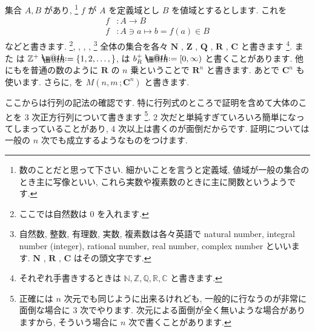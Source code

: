 \documentclass[openany, a4paper, oneside]{jsbook}
\makeatletter
\newcommand*{\defeq}{\mathrel{\rlap{%
\raisebox{0.3ex}{$\m@th\cdot$}}%
\raisebox{-0.3ex}{$\m@th\cdot$}}%
=}
\theoremstyle{break}
\theoremstyle{breakdefn}
\newcommand{\bbZ}{\mathbb{Z}}
\makeatother
\begin{document}
集合 $A,B$ があり,  \footnote{数のことだと思って下さい.
細かいことを言うと定義域, 値域が一般の集合のとき主に写像といい,
これら実数や複素数のときに主に関数というようです.
 }
$f$ が $A$ を定義域とし $B$ を値域とするとします.
これを
\begin{align}
f &:  A \rightarrow B \\
f &: A\ni  a \mapsto     b=f (a)\in B
\end{align}
などと書きます.
 \footnote{ここでは自然数は $0$ を入れます.
 }, , ,
,  \footnote{自然数, 整数, 有理数, 実数, 複素数は各々英語で natural number, integral number (integer),
rational number, real number, complex number といいます.  $\bm{N}$ ,  $\bm{R}$ ,  $\bm{C}$ はその頭文字です.
 }
全体の集合を各々
$\bm{N}$ ,  $\bm{Z}$ ,  $\bm{Q}$ ,  $\bm{R}$ ,  $\bm{C}$ と書きます \footnote{それぞれ手書きするときは $\mathbb{N},\mathbb{Z},\mathbb{Q},\mathbb{R},\mathbb{C}$ と書きます.
 }.
また
は
$\bbZ^+ \defeq \{ 1, 2 , \dots , \}$,
は
 $b_R^+ \defeq [ 0 , \infty )$
と書くことがあります.
他にもを普通の数のように $\bm{R}$ の $n$ 乗ということで $\bm{R}^{n}$ と書きます.
あとで $\bm{C}^{n}$ も使います.
さらに, を $M \left ( n,m \, ;\bm{C}^n \right)$ と書きます.

ここからは行列の記法の確認です. 特に行列式のところで証明を含めて大体のことを 3 次正方行列について書きます \footnote{正確には $n$ 次元でも同じように出来るけれども, 一般的に行なうのが非常に面倒な場合に 3 次でやります.
次元による面倒が全く無いような場合がありますから, そういう場合に $n$ 次で書くことがあります.
 }.
2 次だと単純すぎていろいろ簡単になってしまっていることがあり,
4 次以上は書くのが面倒だからです.
証明については一般の $n$ 次でも成立するようなものをつけます.
\end{document}
